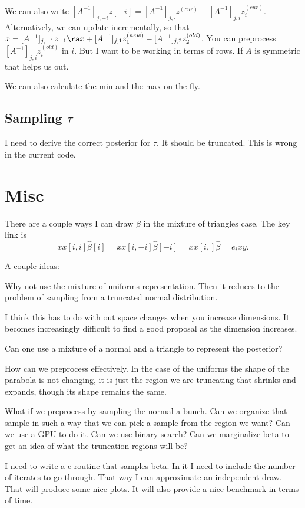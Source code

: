 \documentclass{article}
\begin{document}
We can also write $[A^{-1}]_{j,-i} z[-i] = [A^{-1}]_{j,\cdot} z^{(cur)} -
[A^{-1}]_{j,i} z^{(cur)}_i$.  Alternatively, we can update incrementally, so
that $x = [A^{-1}]_{j,-1} z_{-1} \ra x + [A^{-1}]_{j,1} z_{1}^{(new)} -
[A^{-1}]_{j,2} z_{2}^{(old)}$.  You can preprocess $[A^{-1}]_{j,i} z_i^{(old)}$
in $i$.  But I want to be working in terms of rows.  If $A$ is symmetric that
helps us out.

We can also calculate the min and the max on the fly.

\subsection*{Sampling $\tau$}

I need to derive the correct posterior for $\tau$.  It should be truncated.
This is wrong in the current code.

\section{Misc}

There are a couple ways I can draw $\beta$ in the mixture of triangles case.
The key link is
\[
xx[i,i] \hat \beta[i] = xx[i,-i] \hat \beta[-i] = xx[i,] \hat \beta = e_i xy.
\]

A couple ideas:

Why not use the mixture of uniforms representation.  Then it reduces to the
problem of sampling from a truncated normal distribution.

I think this has to do with out space changes when you increase dimensions.  It
becomes increasingly difficult to find a good proposal as the dimension
increases.

Can one use a mixture of a normal and a triangle to represent the posterior?

How can we preprocess effectively.  In the case of the uniforms the shape of the
parabola is not changing, it is just the region we are truncating that shrinks
and expands, though its shape remains the same.

What if we preprocess by sampling the normal a bunch.  Can we organize that
sample in such a way that we can pick a sample from the region we want?  Can we
use a GPU to do it.  Can we use binary search?  Can we marginalize beta to get
an idea of what the truncation regions will be?

I need to write a c-routine that samples beta.  In it I need to include the
number of iterates to go through.  That way I can approximate an independent
draw.  That will produce some nice plots.  It will also provide a nice benchmark
in terms of time.
\end{document}

